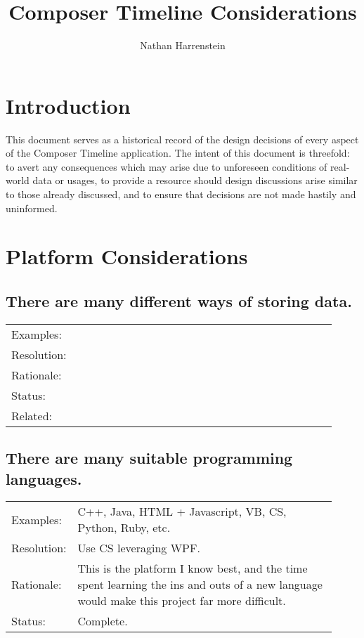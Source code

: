 \documentclass[letterpaper]{report}
\author{Nathan Harrenstein}
\title{Composer Timeline Considerations}
\begin{document}
\maketitle

\renewcommand{\baselinestretch}{1.25}\normalsize
\tableofcontents
\renewcommand{\baselinestretch}{1}\normalsize

\chapter{Introduction}

This document serves as a historical record of the design decisions of every aspect of the Composer Timeline application. The intent of this document is threefold: to avert any consequences which may arise due to unforeseen conditions of real-world data or usages, to provide a resource should design discussions arise similar to those already discussed, and to ensure that decisions are not made hastily and uninformed. 

\chapter{Platform Considerations}

\section{There are many different ways of storing data.}
\label{P.1}

\begin{tabular}{ p{0.1\linewidth} p{0.825\linewidth} }
  Examples:  &  \\ 
  Resolution:  &  \\
  Rationale:  &  \\
  Status:  &  \\
  Related:  & 
\end{tabular}

\section{There are many suitable programming languages.}
\label{P.2}

\begin{tabular}{ p{0.1\linewidth} p{0.825\linewidth} }
  Examples: & C++, Java, HTML + Javascript, VB, CS, Python, Ruby, etc. \\ 
  Resolution: & Use CS leveraging WPF. \\
  Rationale: & This is the platform I know best, and the time spent learning the ins and outs of a new language would make this project far more difficult. \\
  Status: & Complete.
\end{tabular}
\end{document}

